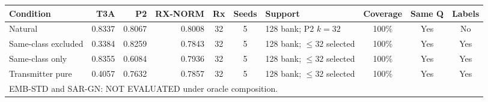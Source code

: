 \begingroup\scriptsize\setlength{\tabcolsep}{3pt}
\begin{tabularx}{\textwidth}{lrrrccXccc}
\toprule
Condition & T3A & P2 & RX-NORM & Rx & Seeds & Support & Coverage & Same Q & Labels\\
\midrule
Natural & 0.8337 & 0.8067 & 0.8008 & 32 & 5 & 128 bank; P2 $k=32$ & 100\% & Yes & No\\
Same-class excluded & 0.3384 & 0.8259 & 0.7843 & 32 & 5 & 128 bank; $\leq32$ selected & 100\% & Yes & Yes\\
Same-class only & 0.8355 & 0.6084 & 0.7936 & 32 & 5 & 128 bank; $\leq32$ selected & 100\% & Yes & Yes\\
Transmitter pure & 0.4057 & 0.7632 & 0.7857 & 32 & 5 & 128 bank; $\leq32$ selected & 100\% & Yes & Yes\\
\midrule
\multicolumn{10}{l}{EMB-STD and SAR-GN: NOT EVALUATED under oracle composition.}\\
\bottomrule
\end{tabularx}\endgroup
